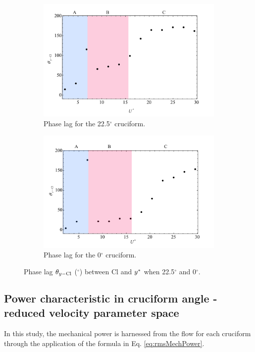 \documentclass[oneside]{utmthesis}
\begin{document}
\begin{figure}
  \centering
  \begin{subfigure}[h]{1\textwidth}
    \includegraphics[width=\textwidth]{figs/phaseLag2}
    \caption{Phase lag for the 22.5$^{\circ}$ cruciform.}
    \label{fig:phaseLag225deg}
  \end{subfigure}
  
  \begin{subfigure}[h]{1\textwidth}
    \includegraphics[width=\textwidth]{figs/phaseLag1}
    \caption{Phase lag for the 0$^{\circ}$ cruciform.}
    \label{fig:phaseLag00deg}
  \end{subfigure}

  \caption{Phase lag $\theta_{y-\text{Cl}}$ ($^{\circ}$) between Cl and $y^{*}$ when 22.5$^{\circ}$ and 0$^{\circ}$.}
  \label{fig:phaseLag22500deg}
\end{figure}

\subsection{Power characteristic in cruciform angle - reduced velocity parameter space}\label{ssec:powerCharacteristic}
In this study, the mechanical power is harnessed from the flow for each cruciform through the application of the formula in Eq. \ref{eq:rmsMechPower}.
\end{document}

